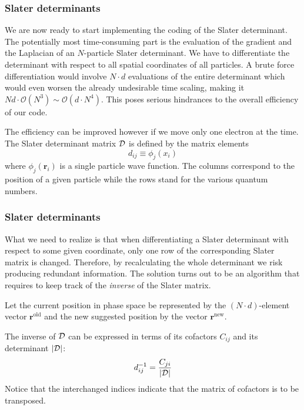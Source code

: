 \documentclass[compress]{beamer}
\newcommand{\be}{\begin{equation}}
\newcommand{\ee}{\end{equation}}
\newcommand{\matr}[1]{{\bf \cal{#1}}}
\renewcommand{\det}[1]{|#1|}
\newcommand{\bigO}{\mathcal{O}}
\newcommand{\be}{\begin{equation}}                        %
\newcommand{\ee}{\end{equation}}                          %
\begin{document}
\frame
{
  \frametitle{Slater determinants}
\begin{small}
{\scriptsize

We are now ready to start implementing the coding of the Slater determinant.
The potentially most time-consuming part is the
evaluation of the gradient and the Laplacian of an $N$-particle  Slater
determinant. We have to differentiate the determinant with respect to
all spatial coordinates of all particles. A brute force
differentiation would involve $N\cdot d$ evaluations of the entire
determinant which would even worsen the already undesirable time
scaling, making it $Nd\cdot\bigO(N^3)\sim \bigO(d\cdot N^4)$.
This poses serious hindrances to the overall efficiency of our code.

The efficiency can be improved however if we move only one electron at the time.
The Slater determinant matrix $\matr D$ is defined by the matrix elements
\be
d_{ij}\equiv\phi_j(x_i)
\ee
where $\phi_j(\mathbf{r}_i)$ is a single particle  wave function.
The columns correspond to the position of a given particle 
while the rows stand for the various quantum numbers.
}
\end{small}
}

\frame
{
  \frametitle{Slater determinants}
\begin{small}
{\scriptsize
What we need to realize is that when differentiating a Slater
determinant with respect to some given coordinate, only one row of the
corresponding Slater matrix is changed. Therefore, by recalculating
the whole determinant we risk producing redundant information. The
solution turns out to be an algorithm that requires to keep track of
the \emph{inverse} of the Slater matrix.

Let the
current position in phase space be represented by the $(N\cdot
d)$-element vector $\mathbf{r}^{\mathrm{old}}$ and the new suggested
position by the vector $\mathbf{r}^{\mathrm{new}}$.


The inverse of $\matr D$ can be expressed in terms of its
cofactors $C_{ij}$ and its determinant $\det{\matr D}$:
\be
d_{ij}^{-1} = \frac{C_{ji}}{\det{\matr D}}
\label{eq:inverse_cofactor}
\ee
Notice that the interchanged indices indicate that the matrix of
cofactors is to be transposed.
}
\end{small}
}
\end{document}
